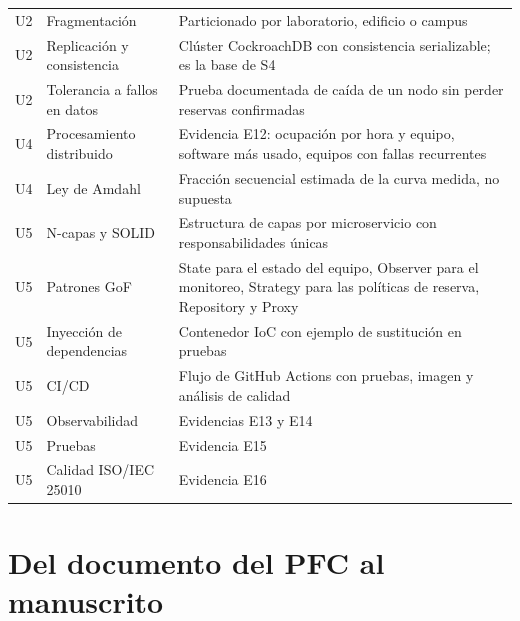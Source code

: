 \documentclass[11pt,a4paper]{article}
\begin{document}
\begin{center}
\begin{longtable}{@{}p{1.2cm}p{5.2cm}p{8.4cm}@{}}
		\addlinespace
		U2 & Fragmentación & Particionado por laboratorio, edificio o campus \\
		U2 & Replicación y consistencia & Clúster CockroachDB con consistencia serializable; es la base de S4 \\
		U2 & Tolerancia a fallos en datos & Prueba documentada de caída de un nodo sin perder reservas confirmadas \\
		\addlinespace
		U4 & Procesamiento distribuido & Evidencia E12: ocupación por hora y equipo, software más usado, equipos con fallas recurrentes \\
		U4 & Ley de Amdahl & Fracción secuencial estimada de la curva medida, no supuesta \\
		\addlinespace
		U5 & N-capas y SOLID & Estructura de capas por microservicio con responsabilidades únicas \\
		U5 & Patrones GoF & State para el estado del equipo, Observer para el monitoreo, Strategy para las políticas de reserva, Repository y Proxy \\
		U5 & Inyección de dependencias & Contenedor IoC con ejemplo de sustitución en pruebas \\
		U5 & CI/CD & Flujo de GitHub Actions con pruebas, imagen y análisis de calidad \\
		U5 & Observabilidad & Evidencias E13 y E14 \\
		U5 & Pruebas & Evidencia E15 \\
		U5 & Calidad ISO/IEC 25010 & Evidencia E16 \\
		\bottomrule
	\end{longtable}
\end{center}

\section{Del documento del PFC al manuscrito}
\end{document}
